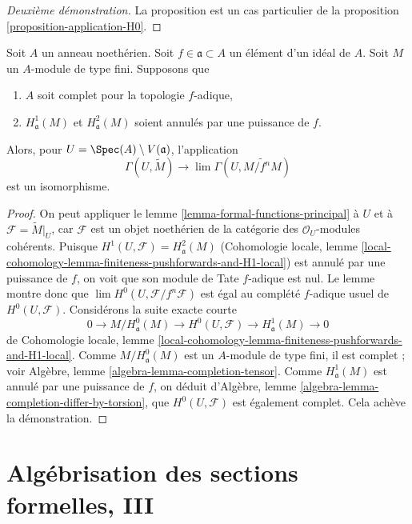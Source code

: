 \begin{proof}[Deuxième démonstration]
La proposition est un cas particulier de la
proposition \ref{proposition-application-H0}.
\end{proof}

\begin{lemma}
\label{lemma-alternative-H0}
Soit $A$ un anneau noethérien. Soit $f \in \mathfrak a \subset A$
un élément d'un idéal de $A$. Soit $M$ un $A$-module de type fini.
Supposons que
\begin{enumerate}
\item $A$ soit complet pour la topologie $f$-adique,
\item $H^1_\mathfrak a(M)$ et $H^2_\mathfrak a(M)$ soient
annulés par une puissance de $f$.
\end{enumerate}
Alors, pour $U = \Spec(A) \setminus V(\mathfrak a)$, l'application
$$
\Gamma(U, \widetilde{M})
\longrightarrow
\lim \Gamma(U, \widetilde{M/f^nM})
$$
est un isomorphisme.
\end{lemma}

\begin{proof}
On peut appliquer le lemme \ref{lemma-formal-functions-principal} à $U$ et à
$\mathcal{F} = \widetilde{M}|_U$, car $\mathcal{F}$ est un objet noethérien de
la catégorie des $\mathcal{O}_U$-modules cohérents.
Puisque $H^1(U, \mathcal{F}) = H^2_\mathfrak a(M)$
(Cohomologie locale, lemme
\ref{local-cohomology-lemma-finiteness-pushforwards-and-H1-local})
est annulé par une puissance de $f$, on voit que
son module de Tate $f$-adique est nul.
Le lemme montre donc que $\lim H^0(U, \mathcal{F}/f^n \mathcal{F})$
est égal au complété $f$-adique usuel de $H^0(U, \mathcal{F})$.
Considérons la suite exacte courte
$$
0 \to M/H^0_\mathfrak a(M) \to H^0(U, \mathcal{F}) \to H^1_\mathfrak a(M) \to 0
$$
de Cohomologie locale, lemme
\ref{local-cohomology-lemma-finiteness-pushforwards-and-H1-local}.
Comme $M/H^0_\mathfrak a(M)$ est un $A$-module de type fini, il est
complet ; voir Algèbre, lemme \ref{algebra-lemma-completion-tensor}.
Comme $H^1_\mathfrak a(M)$ est annulé par une puissance de $f$, on déduit
d'Algèbre, lemme \ref{algebra-lemma-completion-differ-by-torsion},
que $H^0(U, \mathcal{F})$ est également complet. Cela achève la démonstration.
\end{proof}







\section{Algébrisation des sections formelles, III}
\label{section-algebraization-sections-coherent-III}

